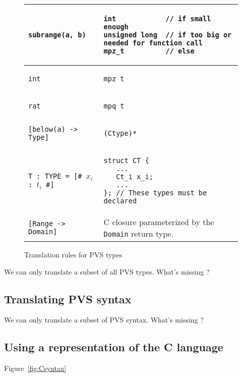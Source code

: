 \documentclass[12pt,a4paper]{article}
\newcommand{\cl}[1]{\texttt{#1}}
\begin{document}
\begin{figure}[!ht]
\begin{tabular}{|l|l|}
\hline
\cl{subrange(a, b)} &
\begin{lstlisting}
int            // if small enough
unsigned long  // if too big or needed for function call
mpz_t          // else
\end{lstlisting} \\ \hline
\cl{int} &
\begin{lstlisting}
mpz_t
\end{lstlisting} \\ \hline
\cl{rat} &
\begin{lstlisting}
mpq_t
\end{lstlisting} \\ \hline
\cl{[below(a) -> Type]} &
\begin{lstlisting}
(Ctype)*
\end{lstlisting} \\ \hline
\cl{T : TYPE = [\# $x_i$ : $t_i$ \#]}  &
\begin{lstlisting}
struct CT {
   ...
   Ct_i x_i;
   ...
}; // These types must be declared
\end{lstlisting} \\ \hline
\cl{[Range -> Domain]} & C closure parameterized by the \cl{Domain} return type.\\ \hline
\end{tabular}
\caption{Translation rules for PVS types}
\end{figure}









We can only translate a subset of all PVS types.
What's missing ?




\subsection{Translating PVS syntax}


We can only translate a subset of PVS syntax.
What's missing ?



\subsection{Using a representation of the C language}

Figure~\ref{fig:Csyntax}
\end{document}
